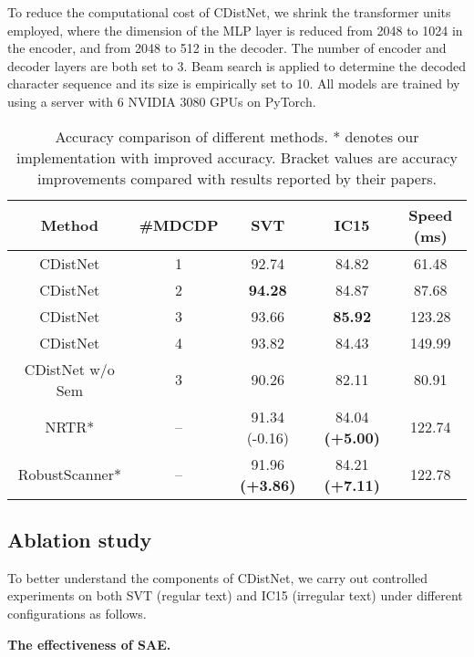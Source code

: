 To reduce the computational cost of CDistNet, we shrink the transformer units employed, where the dimension of the MLP layer is reduced from 2048 to 1024 in the encoder, and from 2048 to 512 in the decoder. The number of encoder and decoder layers are both set to 3. Beam search is applied to determine the decoded character sequence and its size is empirically set to 10. All models are trained by using a server with 6 NVIDIA 3080 GPUs on PyTorch. 

\begin{table*}[h]
\centering
\caption{Accuracy comparison of different methods. * denotes our implementation with improved accuracy. Bracket values are accuracy improvements compared with results reported by their papers.}
\begin{tabular}{c|c|ccc}
\hline
Method & \#MDCDP & SVT &  IC15 & Speed (ms)\\
\hline
CDistNet & 1 & 92.74 &  84.82 & 61.48 \\
CDistNet & 2 & \textbf{94.28}	& 84.87 & 87.68\\
CDistNet & 3 & 93.66 &\textbf{85.92} & 123.28\\
CDistNet & 4 & 93.82 &	84.43 & 149.99\\
\hline
CDistNet w/o Sem & 3 &90.26 & 82.11 & 80.91\\
NRTR*\citep{sheng2019nrtr} & -- & 91.34 (-0.16) & 84.04 \textbf{(+5.00)} & 122.74 \\
RobustScanner*\citep{yue2020robustscanner} & -- & 91.96 \textbf{(+3.86)} & 84.21 \textbf{(+7.11)} & 122.78\\
\hline
\end{tabular}
\label{table:layer comparsion}
\end{table*}

\subsection{Ablation study}
To better understand the components of CDistNet, we carry out controlled experiments on both SVT (regular text) and IC15 (irregular text) under different configurations as follows.


\noindent\textbf{The effectiveness of SAE.} 

